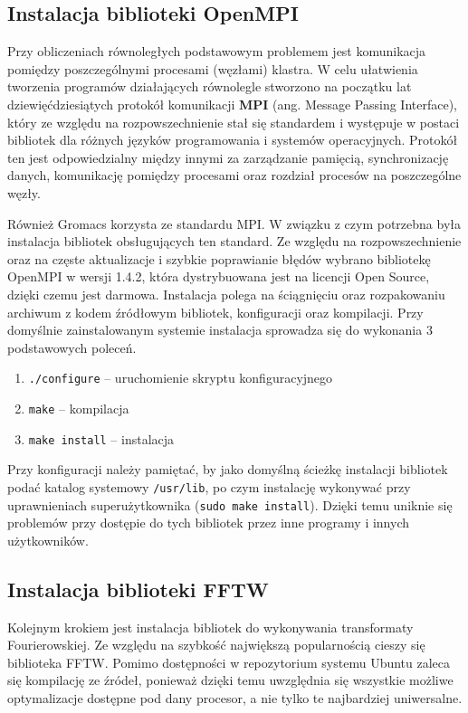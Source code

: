 \subsection{Instalacja biblioteki OpenMPI}

Przy obliczeniach równoległych podstawowym problemem jest komunikacja pomiędzy poszczególnymi procesami (węzłami) klastra. W celu ułatwienia tworzenia programów działających równolegle stworzono na początku lat dziewięćdziesiątych protokół komunikacji \textbf{MPI} (ang. Message Passing Interface), który ze względu na rozpowszechnienie stał się standardem i występuje w postaci bibliotek dla różnych języków programowania i systemów operacyjnych. Protokół ten jest odpowiedzialny między innymi za zarządzanie pamięcią, synchronizację danych, komunikację pomiędzy procesami oraz rozdział procesów na poszczególne węzły. 

Również Gromacs korzysta ze standardu MPI. W związku z czym potrzebna była instalacja bibliotek obsługujących ten standard. Ze względu na rozpowszechnienie oraz na częste aktualizacje i szybkie poprawianie błędów wybrano bibliotekę OpenMPI w wersji 1.4.2, która dystrybuowana jest na licencji Open Source, dzięki czemu jest darmowa. Instalacja polega na ściągnięciu oraz rozpakowaniu archiwum z kodem źródłowym bibliotek, konfiguracji oraz kompilacji. Przy domyślnie zainstalowanym systemie instalacja sprowadza się do wykonania 3 podstawowych poleceń.
\begin{enumerate}
\item \texttt{./configure} -- uruchomienie skryptu konfiguracyjnego
\item \texttt{make} -- kompilacja
\item \texttt{make install} -- instalacja
\end{enumerate}
Przy konfiguracji należy pamiętać, by jako domyślną ścieżkę instalacji bibliotek podać katalog systemowy \texttt{/usr/lib}, po czym instalację wykonywać przy uprawnieniach superużytkownika (\texttt{sudo make install}). Dzięki temu uniknie się problemów przy dostępie do tych bibliotek przez inne programy i innych użytkowników.


\subsection{Instalacja biblioteki FFTW}
Kolejnym krokiem jest instalacja bibliotek do wykonywania transformaty Fourierowskiej. Ze względu na szybkość największą popularnością cieszy się biblioteka FFTW. Pomimo dostępności w repozytorium systemu Ubuntu zaleca się kompilację ze źródeł, ponieważ dzięki temu uwzględnia się wszystkie możliwe optymalizacje dostępne pod dany procesor, a nie tylko te najbardziej uniwersalne.

